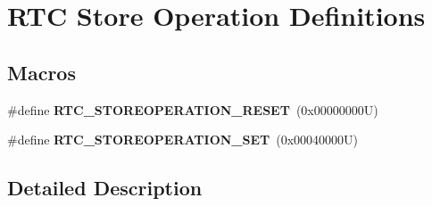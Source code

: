 \hypertarget{group___r_t_c___store_operation___definitions}{}\section{R\+TC Store Operation Definitions}
\label{group___r_t_c___store_operation___definitions}
\subsection*{Macros}
\begin{DoxyCompactItemize}
\item 
\mbox{\label{group___r_t_c___store_operation___definitions_ga0c0fb2efa26fd29872759f6162fafefa}} 
\#define {\bfseries R\+T\+C\+\_\+\+S\+T\+O\+R\+E\+O\+P\+E\+R\+A\+T\+I\+O\+N\+\_\+\+R\+E\+S\+ET}~(0x00000000\+U)
\item 
\mbox{\label{group___r_t_c___store_operation___definitions_ga984ee81edc6b876d035683d65a5c60d8}} 
\#define {\bfseries R\+T\+C\+\_\+\+S\+T\+O\+R\+E\+O\+P\+E\+R\+A\+T\+I\+O\+N\+\_\+\+S\+ET}~(0x00040000\+U)
\end{DoxyCompactItemize}


\subsection{Detailed Description}
